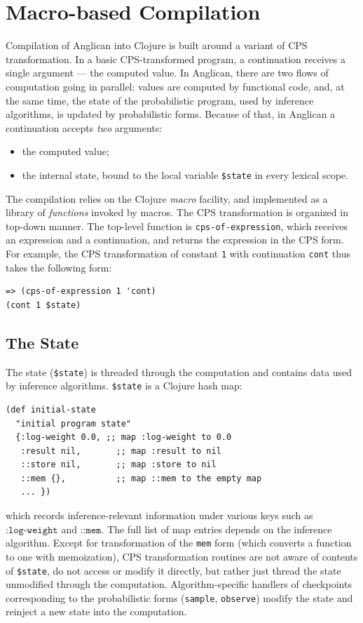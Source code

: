 \documentclass[preprint]{sigplanconf}
\begin{document}
\section{Macro-based Compilation}
\label{sec:compilation}

Compilation of Anglican into Clojure is built around a variant of CPS
transformation. In a basic CPS-transformed program, a
continuation receives a single argument --- the computed value.
In Anglican, there are two flows of computation going in
parallel: values are computed by functional code, and,
at the same time, the state of the probabilistic program,
used by inference algorithms, is updated by
probabilistic forms. Because of that, in Anglican a continuation
accepts  \textit{two} arguments:
\begin{itemize}
    \item the computed value;
    \item the internal state, bound to the local variable
        \texttt{\$state} in every lexical scope.
\end{itemize}

The compilation relies on the Clojure \textit{macro} facility,
and implemented as a library of
\textit{functions}\iftoggle{full}{ in namespace
\texttt{anglican.trap}, which are}{} invoked by macros.  The CPS
transformation is organized in top-down manner.  The top-level
function is  \texttt{cps-of-expression}, which receives an
expression and a continuation, and returns the expression in the
CPS form. For example, the CPS transformation of constant
\texttt{1} with continuation \texttt{cont} thus takes the
following form:
\begin{lstlisting}[style=default]
=> (cps-of-expression 1 'cont)
(cont 1 $state)
\end{lstlisting}

\subsection {The State}
\label{sec:state}

The state (\texttt{\$state}) is threaded through the computation
and contains data used by inference algorithms. \texttt{\$state}
is a Clojure hash map:
\begin{lstlisting}[style=default]
(def initial-state
  "initial program state"
  {:log-weight 0.0, ;; map :log-weight to 0.0
   :result nil,       ;; map :result to nil
   ::store nil,       ;; map :store to nil
   ::mem {},          ;; map ::mem to the empty map 
   ... })
\end{lstlisting}
which records inference-relevant information under various keys
such as $\texttt{:log-weight}$ and $\texttt{::mem}$.
The full list of map entries depends on the inference
algorithm. Except for transformation of
the \texttt{mem} form (which converts a function to one with memoization), 
CPS transformation routines
are not aware of contents of \texttt{\$state}, do not access or
modify it directly, but rather just thread the state unmodified
through the computation. Algorithm-specific handlers of
checkpoints corresponding to the probabilistic forms
(\texttt{sample}, \texttt{observe}) modify the
state and reinject a new state into the computation.
\end{document}

